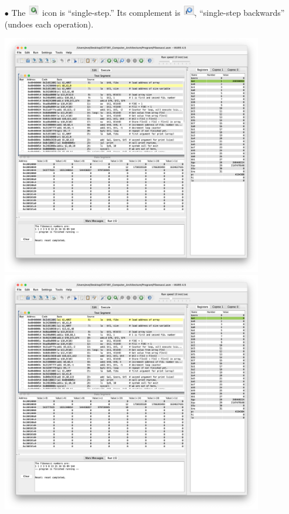 \documentclass[12pt]{article}
\begin{document}
\begin{enumerate}
\begin{itemize}
        \newpage
         \item[$\bullet$] The \includegraphics[width=0.04\textwidth]{22.png} icon is “single-step.” Its complement is \includegraphics[width=0.04\textwidth]{23.png}, “single-step backwards” (undoes each operation).
        \begin{center}
            \includegraphics[width=0.9\textwidth]{24.png}
            \includegraphics[width=0.9\textwidth]{25.png}
         \end{center}


\end{itemize}
\end{enumerate}
\end{document}

